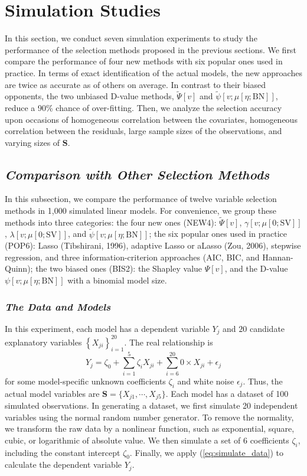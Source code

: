 \documentclass[a4paper,12pt]{article}
\begin{document}
\section{Simulation Studies} \label{sect:simulation}
\noindent
In this section, we conduct seven simulation experiments to study the performance of the selection methods proposed in the previous sections. 
We first compare the performance of four new methods with six popular ones used in practice.
In terms of exact identification of the actual models, the new approaches are twice as accurate as of others on average.
In contrast to their biased opponents, the two unbiased D-value methods, $\tilde \Psi[v]$ and $\tilde\psi[v;\mu[\eta;\mathrm{BN}]]$, reduce a 90\% chance of over-fitting.
Then, we analyze the selection accuracy upon occasions of homogeneous correlation between the covariates, homogeneous correlation between the residuals, large sample sizes of the observations,
and varying sizes of $\mathbf{S}$.


\subsection{\textit{Comparison with Other Selection Methods}}\label{subsect:comparison}

\noindent In this subsection, we compare the performance of twelve variable selection methods in 1,000 simulated linear models.
For convenience, we group these methods into three categories:
the four new ones (NEW4): $\tilde \Psi[v]$, $\gamma[v;\mu[0;\mathrm{SV}]]$, $\lambda[v;\mu[0;\mathrm{SV}]]$, and $\tilde \psi[v;\mu[\eta;\mathrm{BN}]]$;
the six popular ones used in practice (POP6):  Lasso (Tibshirani, 1996), adaptive Lasso or aLasso (Zou, 2006), stepwise regression, and three information-criterion approaches (AIC, BIC, and Hannan-Quinn);
the two biased ones (BIS2): the Shapley value $\Psi[v]$, and the D-value $\psi[v;\mu[\eta;\mathrm{BN}]]$ with a binomial model size.
%

\subsubsection{\textit{The Data and Models}}
\noindent 
In this experiment, each model has a dependent variable $Y_j$ and $20$ candidate explanatory variables $\left \{ X_{ji} \right \}_{i=1}^{20}$. 
The real relationship is
\begin{equation} \label{eq:simulate_data}
Y_j = \zeta_0 + \sum\limits_{i=1}^5 \zeta_i X_{ji} + \sum\limits_{i=6}^{20} 0 \times X_{ji} + \epsilon_j
\end{equation}
for some model-specific unknown coefficients $\zeta_i$ and white noise $\epsilon_j$. Thus, the actual model variables are $\mathbf{S} = \{ X_{j1}, \cdots, X_{j5} \}$.
Each model has a dataset of 100 simulated observations. 
In generating a dataset, we first simulate 20 independent variables using the normal random number generator. 
To remove the normality, we transform the raw data by a nonlinear function, such as exponential, square, cubic, or logarithmic of absolute value. 
We then simulate a set of $6$ coefficients $\zeta_i$, including the constant intercept $\zeta_0$. 
Finally, we apply (\ref{eq:simulate_data}) to calculate the dependent variable $Y_j$.
\end{document}
